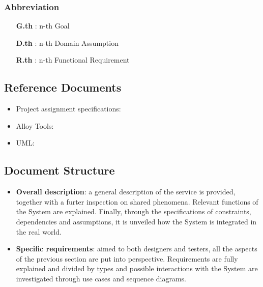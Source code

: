 \subsubsection{Abbreviation}

\begin{itemize}

\item [\textbf{G.th}]: n-th Goal

\item [\textbf{D.th}]: n-th Domain Assumption

\item [\textbf{R.th}]: n-th Functional Requirement

\end{itemize}

\subsection{Reference Documents}

\begin{itemize}

\item Project assignment specifications:\cite{ASSIGNMENT}

\item Alloy Tools: \cite{ALLOY}

\item UML: \cite{UML}

\end{itemize}

\subsection{Document Structure}

\begin{itemize}

\item \textbf{Overall description}: a general description of the service is provided, together with a furter inspection on shared phenomena. Relevant functions of the System are explained. Finally, through the specifications of constraints, dependencies and assumptions, it is unveiled how the System is integrated in the real world.

\item \textbf{Specific requirements}: aimed to both designers and testers, all the aspects of the previous section are put into perspective. Requirements
are fully explained and divided by types and possible interactions with the System are investigated through use cases and sequence diagrams.

\end{itemize}